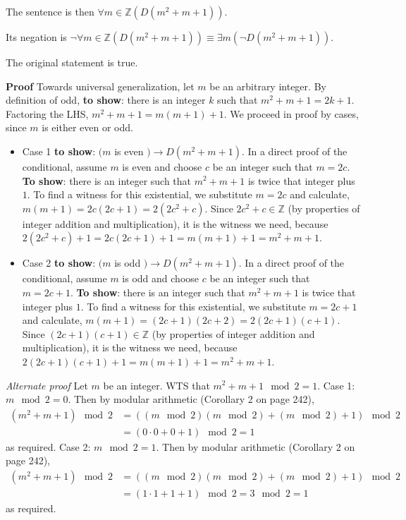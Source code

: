 \documentclass[12pt, oneside]{article}
\begin{document}
\begin{description}
\begin{enumerate}
{  
  The sentence is then $\forall m \in \mathbb{Z} ( D(m^2 + m + 1))$.
  
  Its negation is $\neg \forall m \in \mathbb{Z} ( D(m^2 + m + 1)) \equiv \exists m ( \neg D(m^2 + m + 1))$.
  
  The original statement is true.
  
  {\bf  Proof} Towards universal generalization, let $m$ be an arbitrary integer.  
  By   definition of odd, {\bf to show}: 
  there is an integer $k$ such 
  that $m^2 + m + 1 = 2k + 1$. Factoring the LHS, $m^2 + m + 1 = m(m+1) + 1$.  
  We proceed  in proof by cases, since $m$ is either even or odd.
  \begin{itemize}
  \item Case 1  {\bf to  show}: $(m$ is even $) \to  D(m^2+m+1)$.  In a direct proof of the conditional, 
   assume $m$ is even and choose $c$ be an integer such that $m = 2c$. 
   {\bf To show}: there is an integer such that $m^2+m+1$  is twice  that integer plus $1$.
  To find a witness  for this existential, we substitute  $m=2c$ and calculate, $m(m+1) = 2c(2c+1) = 2( 2c^2 + c) $.
  Since $2c^2 +c \in \mathbb{Z}$ (by properties of integer addition and multiplication), 
  it is the witness we need, because $2(2c^2+c) +1 =  2c(2c+1) +1 = m(m+1)+1 =  m^2+m+1$.
  \item Case 2 {\bf  to  show}: $(m$ is odd $) \to  D(m^2+m+1)$.  In a direct proof of the conditional, 
   assume $m$ is odd and choose $c$ be an integer such that $m = 2c+1$. 
   {\bf To show}: there is an integer such that $m^2+m+1$  is twice  that integer plus $1$.
  To find a witness  for this existential, we substitute  $m=2c+1$ and calculate, $m(m+1) = (2c+1)(2c+2) = 2( 2c+1)(c+1) $.
  Since $(2c+1)(c+1)\in \mathbb{Z}$ (by properties of integer addition and multiplication), 
  it is the witness we need, because $2(2c+1)(c+1)  + 1=  m(m+1) + 1=  m^2+m+1$.
  \end{itemize}
  
  {\it Alternate proof} Let $m$ be an integer.  WTS that $m^2+m+1 \mod 2 = 1$. 
  Case 1: $m \mod 2 = 0$.  Then by modular arithmetic (Corollary 2 on page 242), 
  \begin{align*}
  (m^2 + m + 1) \mod 2 &= \left( (m \mod 2 ) (m \mod 2) + (m \mod 2) + 1 \right) \mod 2 \\
  & = (0 \cdot 0 + 0 +1 ) \mod 2 = 1
  \end{align*}
  as required.  Case 2: $m \mod 2 = 1$.  Then 
  by modular arithmetic (Corollary 2 on page 242), 
  \begin{align*}
  (m^2 + m + 1) \mod 2 &= \left( (m \mod 2 ) (m \mod 2) + (m \mod 2) + 1 \right) \mod 2 \\
  & = (1 \cdot 1 + 1 +1 ) \mod 2 = 3 \mod 2 = 1
  \end{align*}
  as required.
  }
  \else{}
  \fi
  

\end{enumerate}
\end{description}
\end{document}
